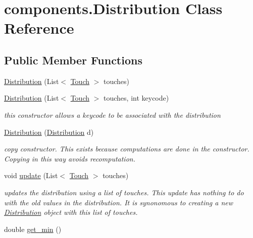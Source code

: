 \hypertarget{classcomponents_1_1_distribution}{}\section{components.\+Distribution Class Reference}
\label{classcomponents_1_1_distribution}
\subsection*{Public Member Functions}
\begin{DoxyCompactItemize}
\item 
\hyperlink{classcomponents_1_1_distribution_a0aef5c1c0f3732a9acc45001a251f345}{Distribution} (List$<$ \hyperlink{classcomponents_1_1_touch}{Touch} $>$ touches)
\item 
\hyperlink{classcomponents_1_1_distribution_a5c1988b4cf235e87955df659df3e15b0}{Distribution} (List$<$ \hyperlink{classcomponents_1_1_touch}{Touch} $>$ touches, int keycode)
\begin{DoxyCompactList}\small\item\em this constructor allows a keycode to be associated with the distribution \end{DoxyCompactList}\item 
\hyperlink{classcomponents_1_1_distribution_ab388f6790c565f71f29dc00cfdbd14fb}{Distribution} (\hyperlink{classcomponents_1_1_distribution}{Distribution} d)
\begin{DoxyCompactList}\small\item\em copy constructor. This exists because computations are done in the constructor. Copying in this way avoids recomputation. \end{DoxyCompactList}\item 
void \hyperlink{classcomponents_1_1_distribution_a1a29a26cfd0b9c6e0b7c2b2639c47880}{update} (List$<$ \hyperlink{classcomponents_1_1_touch}{Touch} $>$ touches)
\begin{DoxyCompactList}\small\item\em updates the distribution using a list of touches. This update has nothing to do with the old values in the distribution. It is synonomous to creating a new \hyperlink{classcomponents_1_1_distribution}{Distribution} object with this list of touches. \end{DoxyCompactList}\item 
double \hyperlink{classcomponents_1_1_distribution_a4a56b607338da9d4353f74316af57eec}{get\+\_\+min} ()
\item 

\end{DoxyCompactItemize}
